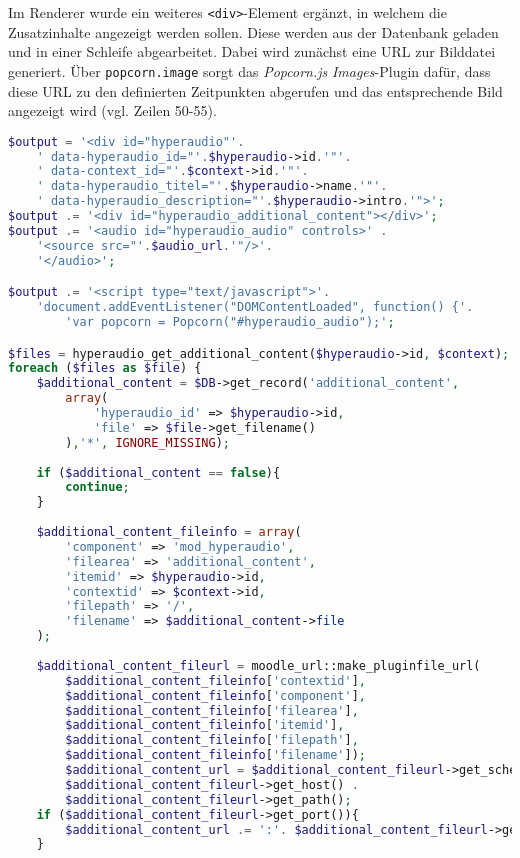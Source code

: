 Im Renderer wurde ein weiteres \texttt{<div>}-Element ergänzt, in welchem die Zusatzinhalte angezeigt werden sollen. Diese werden aus der Datenbank geladen und in einer Schleife abgearbeitet. Dabei wird zunächst eine URL zur Bilddatei generiert. Über \texttt{popcorn.image} sorgt das \textit{Popcorn.js} \textit{Images}-Plugin dafür, dass diese URL zu den definierten Zeitpunkten abgerufen und das entsprechende Bild angezeigt wird (vgl. Zeilen 50-55).

\begin{lstlisting}[language=php,
             linewidth=\textwidth,
             caption={Ausschnitt der \textbf{renderer.php} in der 2. Iteration},
             label={lst:it2:renderer}]
$output = '<div id="hyperaudio"'.
    ' data-hyperaudio_id="'.$hyperaudio->id.'"'.
    ' data-context_id="'.$context->id.'"'.
    ' data-hyperaudio_titel="'.$hyperaudio->name.'"'.
    ' data-hyperaudio_description="'.$hyperaudio->intro.'">';
$output .= '<div id="hyperaudio_additional_content"></div>';
$output .= '<audio id="hyperaudio_audio" controls>' .
    '<source src="'.$audio_url.'"/>'.
    '</audio>';

$output .= '<script type="text/javascript">'.
    'document.addEventListener("DOMContentLoaded", function() {'.
        'var popcorn = Popcorn("#hyperaudio_audio");';

$files = hyperaudio_get_additional_content($hyperaudio->id, $context);
foreach ($files as $file) {
    $additional_content = $DB->get_record('additional_content',
        array(
            'hyperaudio_id' => $hyperaudio->id,
            'file' => $file->get_filename()
	    ),'*', IGNORE_MISSING);
        
    if ($additional_content == false){
        continue;
	}
	
    $additional_content_fileinfo = array(
        'component' => 'mod_hyperaudio',
        'filearea' => 'additional_content',
        'itemid' => $hyperaudio->id,
        'contextid' => $context->id,
        'filepath' => '/',
        'filename' => $additional_content->file
    );
	
    $additional_content_fileurl = moodle_url::make_pluginfile_url(
        $additional_content_fileinfo['contextid'],
        $additional_content_fileinfo['component'],
        $additional_content_fileinfo['filearea'],
        $additional_content_fileinfo['itemid'],
        $additional_content_fileinfo['filepath'],
        $additional_content_fileinfo['filename']);
        $additional_content_url = $additional_content_fileurl->get_scheme() .'://'.
        $additional_content_fileurl->get_host() . 
        $additional_content_fileurl->get_path();
    if ($additional_content_fileurl->get_port()){
        $additional_content_url .= ':'. $additional_content_fileurl->get_port();
    }
	

\end{lstlisting}
